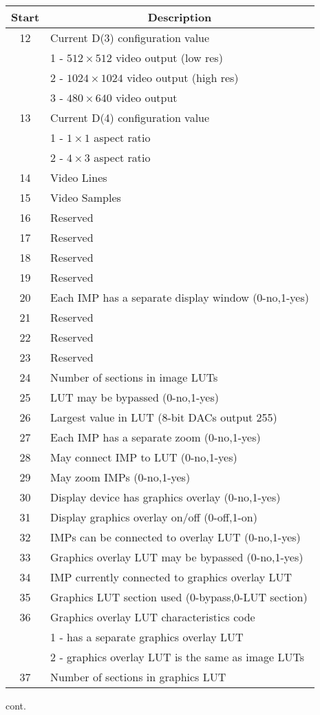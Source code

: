 \begin{tabular}{|c|l|}
\hline
\multicolumn{1}{|c|}{Start}
&\multicolumn{1}{|c|}{Description}\\ \hline
12 & Current D(3) configuration value\\
 & 1 - $512 \times 512$ video output  (low res)\\
 & 2 - $1024 \times 1024$ video output  (high res)\\
 & 3 - $480 \times 640$ video output\\
13 & Current D(4) configuration value\\
 & 1 - $1 \times 1$ aspect ratio\\
 & 2 - $4 \times 3$ aspect ratio\\
14 & Video Lines\\
15 & Video Samples\\
16 & Reserved\\
17 & Reserved\\
18 & Reserved\\
19 & Reserved\\
20 & Each IMP has a separate display window (0-no,1-yes)\\
21 & Reserved\\
22 & Reserved\\
23 & Reserved\\
24 & Number of sections in image LUTs\\
25 & LUT may be bypassed  (0-no,1-yes)\\
26 & Largest value in LUT (8-bit DACs output 255)\\
27 & Each IMP has a separate zoom (0-no,1-yes)\\
28 & May connect IMP to LUT (0-no,1-yes)\\
29 & May zoom IMPs (0-no,1-yes)\\
30 & Display device has graphics overlay  (0-no,1-yes)\\
31 & Display graphics overlay on/off (0-off,1-on)\\
32 & IMPs can be connected to overlay LUT  (0-no,1-yes)\\
33 & Graphics overlay LUT may be bypassed (0-no,1-yes)\\
34 & IMP currently connected to graphics overlay LUT\\
35 & Graphics LUT section used (0-bypass,0-LUT section)\\
36 & Graphics overlay LUT characteristics code\\
 & 1 - has a separate graphics overlay LUT\\
 & 2 - graphics overlay LUT is the same as image LUTs\\
37 & Number of sections in graphics LUT\\ \hline
\end{tabular}
\newpage
cont.

